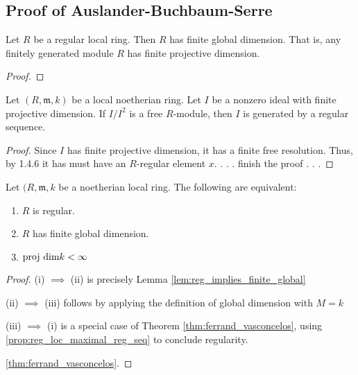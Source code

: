\subsection{Proof of Auslander-Buchbaum-Serre}



\begin{lemma}
  \label{lem:reg_implies_finite_global}
  Let $R$ be a regular local ring.
  Then $R$ has finite global dimension.
  That is, any finitely generated module $R$ has finite
  projective dimension.
\end{lemma}

\begin{proof}
\end{proof}

\begin{theorem}
  \label{thm:ferrand_vasconcelos}

  Let $(R,\mathfrak{m},k)$ be a local noetherian ring.
  Let $I$ be a nonzero ideal with finite projective dimension.
  If $I / I^2$ is a free $R$-module, 
  then $I$ is generated by a regular sequence.
\end{theorem}

\begin{proof}
  Since $I$ has finite projective dimension, it has a finite free
  resolution.
  Thus, by 1.4.6 it has must have an $R$-regular element $x$.
  . . . finish the proof . . . 
\end{proof}


\begin{theorem}
  \label{thm:auslander_buchsbaum_serre}
  Let $(R,\mathfrak{m},k$ be a noetherian local ring.
  The following are equivalent:
  \begin{enumerate}[label=(\roman*)]
    \item $R$ is regular.
    \item $R$ has finite global dimension.
    \item $\text{proj dim} k < \infty$
  \end{enumerate}
\end{theorem}

\begin{proof}

  (i) $\implies$ (ii) is precisely Lemma \ref{lem:reg_implies_finite_global}

  (ii) $\implies$ (iii) follows by applying the definition of global dimension with $M=k$

  (iii) $\implies$ (i) is a special case of Theorem \ref{thm:ferrand_vasconcelos},
  using \ref{prop:reg_loc_maximal_reg_seq} to 
  conclude regularity.

  \ref{thm:ferrand_vasconcelos}.
\end{proof}

